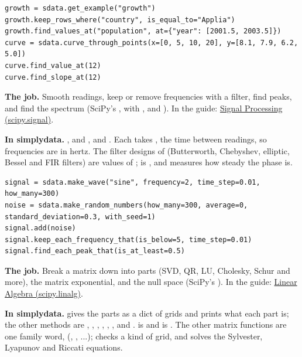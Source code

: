\begin{lstlisting}[style=py]
growth = sdata.get_example("growth")
growth.keep_rows_where("country", is_equal_to="Applia")
growth.find_values_at("population", at={"year": [2001.5, 2003.5]})
curve = sdata.curve_through_points(x=[0, 5, 10, 20], y=[8.1, 7.9, 6.2, 5.0])
curve.find_value_at(12)
curve.find_slope_at(12)
\end{lstlisting}


\textbf{The job.} Smooth readings, keep or remove frequencies with a filter, find peaks, and find the
spectrum (SciPy's ,  with ,  and
). In the guide: \href{https://docs.scipy.org/doc/scipy/tutorial/signal.html}{Signal
Processing (scipy.signal)}.

\textbf{In simplydata.} ,  and
,  and . Each
takes , the time between readings, so frequencies are in hertz. The filter designs of
 (Butterworth, Chebyshev, elliptic, Bessel and FIR filters) are values of
;  is , and
 measures how steady the phase is.

\begin{lstlisting}[style=py]
signal = sdata.make_wave("sine", frequency=2, time_step=0.01, how_many=300)
noise = sdata.make_random_numbers(how_many=300, average=0, standard_deviation=0.3, with_seed=1)
signal.add(noise)
signal.keep_each_frequency_that(is_below=5, time_step=0.01)
signal.find_each_peak_that(is_at_least=0.5)
\end{lstlisting}


\textbf{The job.} Break a matrix down into parts (SVD, QR, LU, Cholesky, Schur and more), the matrix
exponential, and the null space (SciPy's ). In the guide:
\href{https://docs.scipy.org/doc/scipy/tutorial/linalg.html}{Linear Algebra (scipy.linalg)}.

\textbf{In simplydata.}  gives the parts as a dict of
grids and prints what each part is; the other methods are , ,
, , , ,  and .
 is  and  is . The other
matrix functions are one family word,  (, ,
 ...);  checks a kind of grid, and
 solves the Sylvester, Lyapunov and Riccati equations.

